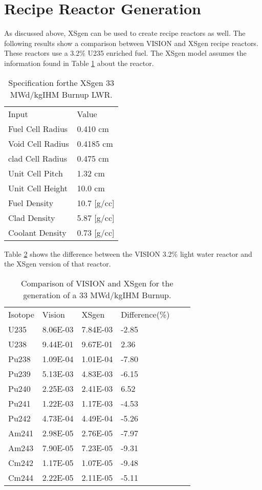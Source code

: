 \documentclass{article}
\begin{document}
\section{Recipe Reactor Generation}
As discussed above, XSgen can be used to create recipe reactors as well. The following results show a comparison between VISION and XSgen recipe reactors. These reactors use a 3.2\% U235 enriched fuel. The XSgen model assumes the information found in Table \ref{tab:xsgenstats} about the reactor.

\begin{table}[!htb]
\centering
\caption{Specification forthe XSgen 33 MWd/kgIHM Burnup LWR.}
\label{tab:xsgenstats}
\begin{tabular}{ll}
Input & Value \\
Fuel Cell Radius & 0.410 cm \\
Void Cell Radius & 0.4185 cm \\
clad Cell Radius & 0.475 cm \\
Unit Cell Pitch  & 1.32 cm \\
Unit Cell Height & 10.0 cm \\
Fuel Density & 10.7 [g/cc] \\
Clad Density & 5.87 [g/cc] \\
Coolant Density & 0.73 [g/cc]
\end{tabular}
\end{table}

Table \ref{tab:recipe} shows the difference between the VISION 3.2\% light water reactor and the XSgen version of that reactor.

\begin{table}[!htb]
\centering
\caption{Comparison of VISION and XSgen for the generation of a 33 MWd/kgIHM Burnup.}
\label{tab:recipe}
\begin{tabular}{llllll}
Isotope & Vision & XSgen & Difference(\%) \\
U235 & 8.06E-03 & 7.84E-03 & -2.85 \\
U238 & 9.44E-01 & 9.67E-01 & 2.36 \\
Pu238 & 1.09E-04 & 1.01E-04 & -7.80 \\
Pu239 & 5.13E-03 & 4.83E-03 & -6.15 \\
Pu240 & 2.25E-03 & 2.41E-03 & 6.52 \\
Pu241 & 1.22E-03 & 1.17E-03 & -4.53 \\
Pu242 & 4.73E-04 & 4.49E-04 & -5.26 \\
Am241 & 2.98E-05 & 2.76E-05 & -7.97 \\
Am243 & 7.90E-05 & 7.23E-05 & -9.31 \\
Cm242 & 1.17E-05 & 1.07E-05 & -9.48 \\
Cm244 & 2.22E-05 & 2.11E-05 & -5.11 \\
\end{tabular}
\end{table}
\end{document}
